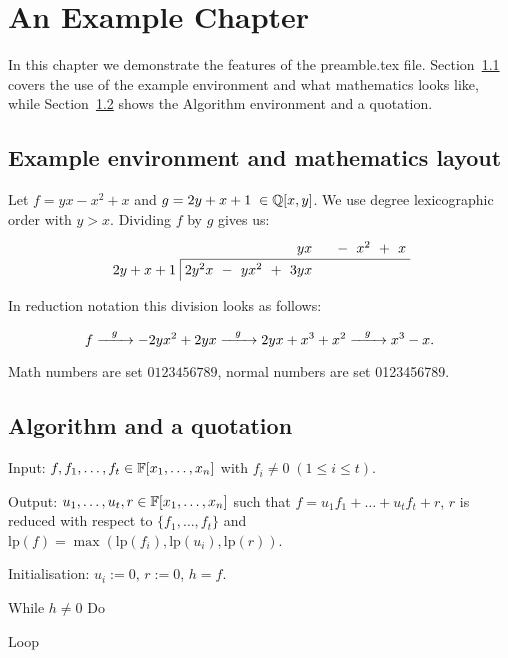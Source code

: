 \documentclass[a4paper, 12pt]{report}
\begin{document}
	
	\chapter{An Example Chapter} %
	\label{cha:an_example_chapter}

		In this chapter we demonstrate the features of the preamble.tex file. Section~\ref{sec:example_environment_and_mathematics_layout} covers the use of the example environment and what mathematics looks like, while Section~\ref{sec:algorithm_and_a_quotation} shows the Algorithm environment and a quotation.

		\section{Example environment and mathematics layout} %
		\label{sec:example_environment_and_mathematics_layout}

			\lipsum[1]

			\begin{example}
				Let $f=yx-x^2+x$ and $g=2y+x+1 \; \in {\mathbb Q}[x,y]$. We use degree lexicographic order with $y>x$. Dividing $f$ by $g$ gives us:
				\[
					\setlength{\arraycolsep}{3pt}
					\renewcommand{\arraystretch}{1.3}
					\begin{array}{r r r r r r r r r r r r}
						&&&&& yx &&& - & x^2 & + & x \\
						\cline{2-12}
						\multicolumn{1}{r|}{2y+x+1}%
						 & 2y^2x & - &  yx^2 & + & 3yx \\
					\end{array}
				\]

				In reduction notation this division looks as follows:

				\[
					f \myrightarrow{g} -2yx^2+2yx \myrightarrow{g} 2yx+x^3+x^2 \myrightarrow{g} x^3-x.
				\]
			\end{example}

			Math numbers are set $0123456789$, normal numbers are set 0123456789.
		

		\section{Algorithm and a quotation} %
		\label{sec:algorithm_and_a_quotation}

			\begin{algorithm}
			\label{alg:multi}
			Input: $f,f_1,\ldots,f_t \in {\mathbb F}[x_1,\ldots,x_n]$ with $f_i\neq 0 \; (1\leq i\leq t)$.
			
			Output: $u_1,\ldots,u_t,r \in {\mathbb F}[x_1,\ldots,x_n]$ such that $f = u_1f_1 + \ldots + u_tf_t + r$, $r$ is reduced with respect to $\{f_1,\ldots,f_t\}$ and $\mathrm{lp}(f) = \max(\mathrm{lp}(f_i),\mathrm{lp}(u_i),\mathrm{lp}(r))$.
			
			Initialisation: $u_i:=0$, $r:=0$, $h=f$.
			
			While $h\neq 0$ Do
			
			Loop
		\end{algorithm}
\end{document}
